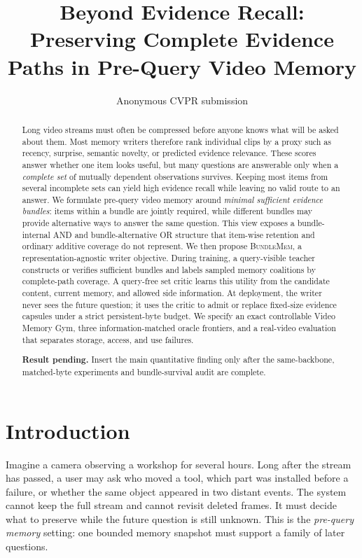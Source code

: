 \documentclass[10pt,twocolumn,letterpaper]{article}
\title{Beyond Evidence Recall: Preserving Complete Evidence Paths in Pre-Query Video Memory}
\author{Anonymous CVPR submission}
\newcommand{\method}{\textnormal{\textsc{BundleMem}}\xspace}
\newcommand{\resultpending}[1]{%
  \begingroup\setlength{\fboxsep}{3pt}%
  \colorbox{placeholdergray}{\parbox{0.94\linewidth}{\textcolor{draftorange}{\textbf{Result pending.} #1}}}%
  \endgroup}
\begin{document}
\maketitle

\begin{abstract}
Long video streams must often be compressed before anyone knows what will be asked about them.
Most memory writers therefore rank individual clips by a proxy such as recency, surprise, semantic novelty, or predicted evidence relevance.
These scores answer whether one item looks useful, but many questions are answerable only when a \emph{complete set} of mutually dependent observations survives.
Keeping most items from several incomplete sets can yield high evidence recall while leaving no valid route to an answer.
We formulate pre-query video memory around \emph{minimal sufficient evidence bundles}: items within a bundle are jointly required, while different bundles may provide alternative ways to answer the same question.
This view exposes a bundle-internal AND and bundle-alternative OR structure that item-wise retention and ordinary additive coverage do not represent.
We then propose \method, a representation-agnostic writer objective.
During training, a query-visible teacher constructs or verifies sufficient bundles and labels sampled memory coalitions by complete-path coverage.
A query-free set critic learns this utility from the candidate content, current memory, and allowed side information.
At deployment, the writer never sees the future question; it uses the critic to admit or replace fixed-size evidence capsules under a strict persistent-byte budget.
We specify an exact controllable Video Memory Gym, three information-matched oracle frontiers, and a real-video evaluation that separates storage, access, and use failures.
\resultpending{Insert the main quantitative finding only after the same-backbone, matched-byte experiments and bundle-survival audit are complete.}
\end{abstract}

\section{Introduction}
\label{sec:intro}

Imagine a camera observing a workshop for several hours.
Long after the stream has passed, a user may ask who moved a tool, which part was installed before a failure, or whether the same object appeared in two distant events.
The system cannot keep the full stream and cannot revisit deleted frames.
It must decide what to preserve while the future question is still unknown.
This is the \emph{pre-query memory} setting: one bounded memory snapshot must support a family of later questions.
\end{document}
